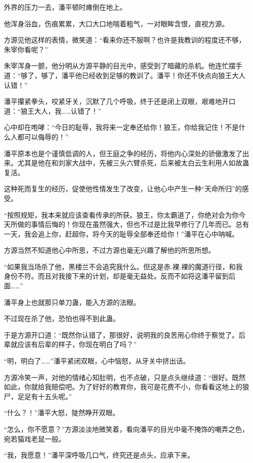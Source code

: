 \begin{this_body}
外界的压力一去，潘平顿时瘫倒在地上。

他浑身浴血，伤痕累累，大口大口地喘着粗气，一对眼眸含恨，直视方源。

方源见他这样的表情，微笑道：“看来你还不服啊？也许是我教训的程度还不够，朱宰你看呢？”

朱宰浑身一颤，他分明从方源平静的目光中，感受到了暗藏的杀机。他连忙摆手道：“够了，够了，潘平他已经收到足够的教训了。潘平！你还不快点向狼王大人认错！”

潘平攥紧拳头，咬紧牙关，沉默了几个呼吸，终于还是闭上双眼，艰难地开口道：“狼王大人，我……认错了！”

心中却在咆哮：“今日的耻辱，我将来一定奉还给你！狼王，你给我记住！不是什么人都可以侮辱的！”

潘平原本也是个谨慎低调的人，但王庭之争的经历，将他内心深处的骄傲激发了出来。尤其是他在和刘家大战中，先被三头六臂杀死，后来被太白云生利用人如故蛊复活。

这种死而复生的经历，促使他性情发生了改变，让他心中产生一种“天命所归”的感受。

“按照规矩，我本来就应该查看传承的所获。狼王，你太霸道了，你绝对会为你今天所做的事情后悔的！你现在虽然强大，但也不过是比我早修行了几年而已。总有一天，我会追上你，赶超你，将今天的耻辱全部奉还给你！”潘平在心中呐喊。

方源当然不知道他心中所思，不过方源也毫无兴趣了解他的所思所想。

“如果我当场杀了他，黑楼兰不会追究我什么。但这是赤.裸.裸的魔道行径，和我身份不符。而且对我接下来的计划，却是毫无益处。反而不如将这潘平留到后面……”

潘平身上也就那只单刀蛊，能入方源的法眼。

不过现在杀了他，恐怕也得不到此蛊。

于是方源开口道：“既然你认错了，那很好，说明我的良苦用心你终于察觉了。后辈就应该有后辈的样子，你现在明白了吗？”

“明，明白了……”潘平紧闭双眼，心中恼怒，从牙关中挤出话。

方源冷笑一声，对他的情绪心知肚明，也不点破，只是点头继续道：“很好。既然如此，你就给我赔偿吧。为了好好的教育你，我可是花费不小，你看看这地上的狼尸，足足有十五头呢。”

“什么？！”潘平大怒，陡然睁开双眼。

“怎么，你不愿意？”方源淡淡地微笑着，看向潘平的目光中毫不掩饰的嘲弄之色，宛若猫戏老鼠一般。

“我，我愿意！”潘平深呼吸几口气，终究还是点头，应承下来。


\end{this_body}
